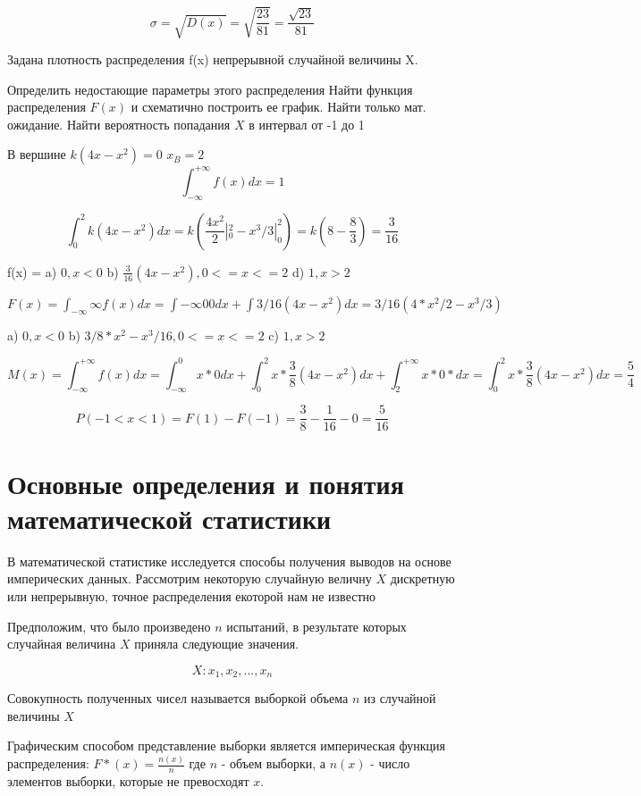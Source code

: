 \documentclass[a4paper]{article}
\begin{document}
$$ \sigma = \sqrt{D(x)} = \sqrt{\frac{23}{81}} = \frac{\sqrt{23}}{81} $$ 

Задана плотность распределения f(x) непрерывной случайной величины X. 

Определить недостающие параметры этого распределения
Найти функция распределения $F(x)$
и схематично построить ее график.
Найти только мат. ожидание.
Найти вероятность попадания $X$ в интервал от -1 до 1

В вершине
$ k(4x - x^2) = 0 $
$ x_B = 2 $
$$ \int_{-\infty}^{+\infty} f(x)dx  = 1 $$

\begin{dmath}
\int_0^2 k(4x - x^2) dx = k (\frac{4x^2}{2} |_0^2 - x^3/ 3 |_0^2 ) = k (8 - \frac{8}{3}) = \frac{3}{16}
\end{dmath}

f(x) = 
a) $0, x < 0 $
b) $\frac{3}{16}(4x - x^2), 0 <= x <= 2$
d) $1, x > 2$

$ F(x) = \int_{-\infty}{\infty} f(x)dx = \int{-\infty}{0}0dx + \int3/16(4x - x^2)dx = 3/16 (4*x^2/2 - x^3/3) $

a) $0, x < 0$
b) $3/8 * x^2 - x^3/16, 0 <= x <= 2$
c) $1, x > 2$

\begin{dmath}
 M(x) = \int_{-\infty}^{+\infty} f(x) dx = \int _{-\infty}^{0}x*0dx + \int_0^2 x * \frac{3}{8} (4x - x^2)dx + \int_{2}^{+\infty}x*0*dx = \int_0^2 x * \frac{3}{8} (4x - x^2)dx = \frac{5}{4} 
\end{dmath}

$$ P(-1 < x < 1) = F(1) - F(-1) = \frac{3}{8} - \frac{1}{16} - 0 = \frac{5}{16} $$

\section{Основные определения и понятия математической статистики}
В математической статистике исследуется способы получения выводов на основе имперических данных.
Рассмотрим некоторую случайную величну $X$ дискретную или непрерывную, точное распределения екоторой нам не известно

Предположим, что было произведено $n$ испытаний, в результате которых случайная величина $X$ приняла следующие значения.

$$X: {x_1, x_2, ..., x_n}$$ 

Совокупность полученных чисел называется выборкой объема $n$ из случайной величины $X$

Графическим способом представление выборки является империческая функция распределения: $F*(x) = \frac{n(x)}{n}$
где $n$ - объем выборки, а $n(x)$ - число элементов выборки, которые не превосходят $x$.
\end{document}
